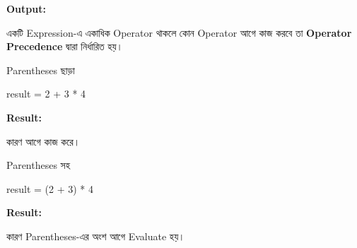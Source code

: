 \textbf{Output:}
\textenglish{}



একটি Expression-এ একাধিক Operator থাকলে কোন Operator আগে
কাজ করবে তা \textbf{Operator Precedence} দ্বারা নির্ধারিত হয়।

\noindent
\begin{minipage}[t]{0.49\linewidth}

\begin{sideexamplebox}{Parentheses ছাড়া}

\begin{sidecodebox}
\begin{english}
\ttfamily
result = 2 + 3 * 4
\end{english}
\end{sidecodebox}

\textbf{Result:}
\textenglish{}

\medskip

কারণ
\textenglish{\ttfamily *}
আগে কাজ করে।

\end{sideexamplebox}

\end{minipage}
\hfill
\begin{minipage}[t]{0.49\linewidth}

\begin{sideexamplebox}{Parentheses সহ}

\begin{sidecodebox}
\begin{english}
\ttfamily
result = (2 + 3) * 4
\end{english}
\end{sidecodebox}

\textbf{Result:}
\textenglish{}

\medskip

কারণ Parentheses-এর অংশ আগে Evaluate হয়।

\end{sideexamplebox}

\end{minipage}


